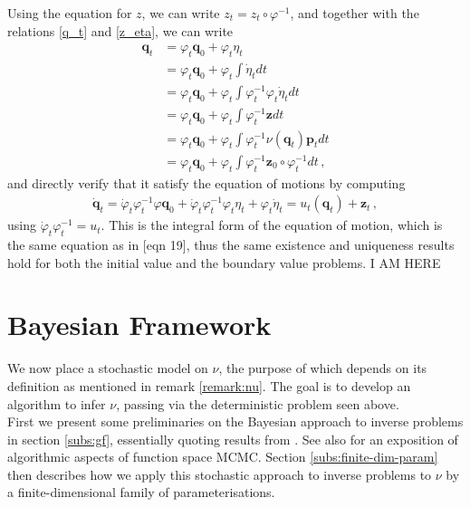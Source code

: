 \documentclass[runningheads]{llncs}
\begin{document}
Using the equation for $z$, we can write $z_t = z_t \circ \varphi^{-1}$, and
together with the relations \eqref{q_t} and \eqref{z_eta}, we can write
\begin{align*}
  \mathbf q_t &= \varphi_t \mathbf q_0 + \varphi_t \eta_t\\
   &= \varphi_t \mathbf q_0 + \varphi_t \int \dot \eta_t dt\\
   &= \varphi_t \mathbf q_0 + \varphi_t \int \varphi_t^{-1} \varphi_t\dot \eta_t dt\\
   &= \varphi_t \mathbf q_0 + \varphi_t \int  \varphi_t^{-1}\mathbf z dt \\
   &= \varphi_t \mathbf q_0 + \varphi_t \int  \varphi_t^{-1}\nu(\mathbf q_t) \mathbf p_t  dt\\
   &= \varphi_t \mathbf q_0 + \varphi_t \int  \varphi_t^{-1}\mathbf z_0\circ \varphi_t^{-1} dt\, , 
\end{align*}
and directly verify that it satisfy the equation of motions by computing
\begin{align*}
  \dot {\mathbf q}_t = \dot \varphi_t \varphi_t^{-1} \varphi \mathbf q_0 + \dot
  \varphi_t \varphi_t^{-1} \varphi_t \eta_t + \varphi_t \dot \eta_t  = u_t(
  \mathbf q_t) + \mathbf z_t\, ,
\end{align*}
using $\dot \varphi_t\varphi_t^{-1} = u_t$. 
This is the integral form of the equation of motion, which is the same equation
as in \cite{holm2009euler}[eqn 19], thus the same existence and uniqueness
results hold for both the initial value and the boundary value problems.
{\color{red} I AM HERE}

\section{Bayesian Framework}\label{sec:bayesian}

We now place a stochastic model on $\nu$, the purpose of which depends on its
definition as mentioned in remark \eqref{remark:nu}. The goal is to develop an
algorithm to infer $\nu$, passing via the deterministic problem seen above.\\

First we present some preliminaries on the Bayesian approach to inverse problems
in section \ref{subs:gf}, essentially quoting results from
\cite{dashti2017bayesian}.  See also \cite{cotter2013mcmc} for an exposition of
algorithmic aspects of function space MCMC. Section \ref{subs:finite-dim-param}
then describes how we apply this stochastic approach to inverse problems to
$\nu$ by a finite-dimensional family of parameterisations.
\end{document}
